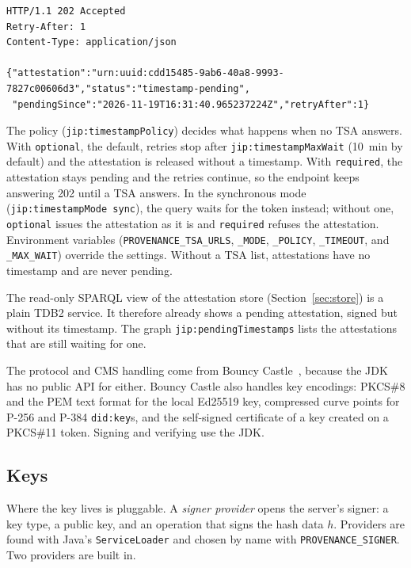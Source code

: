 \documentclass[11pt,a4paper]{article}
\newcommand{\code}[1]{\texttt{#1}}
\begin{document}
\begin{lstlisting}[basicstyle=\ttfamily\footnotesize, caption={The attestation endpoint right after the attested query of the demo.}, label={lst:pending}]
HTTP/1.1 202 Accepted
Retry-After: 1
Content-Type: application/json

{"attestation":"urn:uuid:cdd15485-9ab6-40a8-9993-7827c00606d3","status":"timestamp-pending",
 "pendingSince":"2026-11-19T16:31:40.965237224Z","retryAfter":1}
\end{lstlisting}

The policy (\code{jip:timestampPolicy}) decides what happens when no TSA answers. With
\code{optional}, the default, retries stop after \code{jip:timestampMaxWait} (10~min by
default) and the attestation is released without a timestamp. With \code{required}, the
attestation stays pending and the retries continue, so the endpoint keeps answering 202 until a
TSA answers. In the synchronous mode (\code{jip:timestampMode sync}), the query waits for the
token instead; without one, \code{optional} issues the attestation as it is and
\code{required} refuses the attestation. Environment variables (\code{PROVENANCE\_TSA\_URLS}, \code{\_MODE},
\code{\_POLICY}, \code{\_TIMEOUT}, and \code{\_MAX\_WAIT}) override the settings. Without a TSA
list, attestations have no timestamp and are never pending.

The read-only SPARQL view of the attestation store (Section~\ref{sec:store}) is a plain TDB2
service. It therefore already shows a pending attestation, signed but without its timestamp.
The graph \code{jip:pendingTimestamps} lists the attestations that are still waiting for one.

The protocol and CMS handling come from Bouncy Castle~\cite{bouncycastle}, because the JDK has
no public API for either. Bouncy Castle also handles key encodings: PKCS\#8 and the PEM text
format for the local Ed25519 key, compressed curve points for P-256 and P-384 \code{did:key}s, and the self-signed
certificate of a key created on a PKCS\#11 token. Signing and verifying use the JDK.

\subsection{Keys}
\label{sec:keys}

Where the key lives is pluggable. A \emph{signer provider} opens the server's signer: a key
type, a public key, and an operation that signs the hash data $h$. Providers are found with
Java's \code{ServiceLoader} and chosen by name with \code{PROVENANCE\_SIGNER}. Two providers
are built in.
\end{document}
